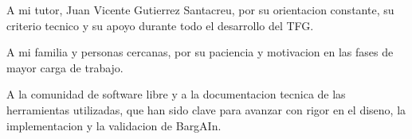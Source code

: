 
A mi tutor, Juan Vicente Gutierrez Santacreu, por su orientacion constante,
su criterio tecnico y su apoyo durante todo el desarrollo del TFG.

A mi familia y personas cercanas, por su paciencia y motivacion en las fases
de mayor carga de trabajo.

A la comunidad de software libre y a la documentacion tecnica de las
herramientas utilizadas, que han sido clave para avanzar con rigor en
el diseno, la implementacion y la validacion de BargAIn.